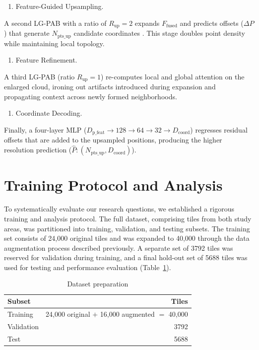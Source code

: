 \documentclass[12pt]{report}
\begin{document}
\begin{enumerate}
\item[(4)] {Feature-Guided Upsampling.}
\end{enumerate}

A second LG-PAB with a ratio of $R_{\text{up}}=2$ expands $F_{\text{fused}}$ and predicts offsets ($\Delta P$) that generate $N_{\text{pts\_up}}$ candidate coordinates
. This stage doubles point density while maintaining local topology.

\begin{enumerate}
\item[(5)] {Feature Refinement.}
\end{enumerate}

A third LG-PAB (ratio $R_{\text{up}}=1$) re-computes local and global attention on the enlarged cloud, ironing out artifacts introduced during expansion and propagating context across newly formed neighborhoods.

\begin{enumerate}
\item[(6)] {Coordinate Decoding.}
\end{enumerate}

Finally, a four-layer MLP ($D_{\text{p\_feat}} \rightarrow 128 \rightarrow 64 \rightarrow 32 \rightarrow D_{\text{coord}}$) regresses residual offsets that are added to the upsampled positions, producing the higher resolution prediction ($\hat{P}: (N_{\text{pts\_up}}, D_{\text{coord}})$).

\section{Training Protocol and Analysis}
\label{sec:study_design}
To systematically evaluate our research questions, we established a rigorous training and analysis protocol. The full dataset, comprising tiles from both study areas, was partitioned into training, validation, and testing subsets. The training set consists of 24,000 original tiles and was expanded to 40,000 through the data augmentation process described previously. A separate set of 3792 tiles was reserved for validation during training, and a final hold-out set of 5688 tiles was used for testing and performance evaluation \mbox{(Table \ref{tab:data_prep})}.
\begin{table}[htbp]
  \centering
  \caption{Dataset preparation}
  \label{tab:data_prep}
  \begin{tabular}{lr}
    \toprule
    \textbf{Subset} & \textbf{Tiles} \\
    \midrule
    Training        & 24,000 original $+$ 16,000 augmented $=$ 40,000 \\
    Validation      & 3792 \\
    Test            & 5688 \\
    \bottomrule
  \end{tabular}
\end{table}
\end{document}
